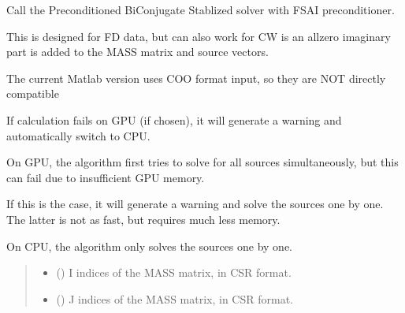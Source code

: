 \documentclass[letterpaper,10pt,english]{sphinxmanual}
\begin{document}
\begin{fulllineitems}
\label{\detokenize{_autosummary/nirfasterff.math.get_field_FD:nirfasterff.math.get_field_FD}}
\pysigstartsignatures
\pysiglinewithargsret
{}
{\sphinxparamcomma {}\sphinxparamcomma {}\sphinxparamcomma {}\sphinxparamcomma {}\sphinxparamcomma {}}
{}
\pysigstopsignatures
\sphinxAtStartPar
Call the Preconditioned BiConjugate Stablized solver with FSAI preconditioner.

\sphinxAtStartPar
This is designed for FD data, but can also work for CW is an all\sphinxhyphen{}zero imaginary part is added to the MASS matrix and source vectors.

\sphinxAtStartPar
The current Matlab version uses COO format input, so they are NOT directly compatible

\sphinxAtStartPar
If calculation fails on GPU (if chosen), it will generate a warning and automatically switch to CPU.

\sphinxAtStartPar
On GPU, the algorithm first tries to solve for all sources simultaneously, but this can fail due to insufficient GPU memory.

\sphinxAtStartPar
If this is the case, it will generate a warning and solve the sources one by one. The latter is not as fast, but requires much less memory.

\sphinxAtStartPar
On CPU, the algorithm only solves the sources one by one.
\begin{quote}\begin{description}
\begin{itemize}
\item {} 
\sphinxAtStartPar
{} (\sphinxstyleliteralemphasis{\sphinxupquote{, }}) \textendash{} I indices of the MASS matrix, in CSR format.

\item {} 
\sphinxAtStartPar
{} (\sphinxstyleliteralemphasis{\sphinxupquote{, }}) \textendash{} J indices of the MASS matrix, in CSR format.


\end{itemize}
\end{description}
\end{quote}
\end{fulllineitems}
\end{document}
